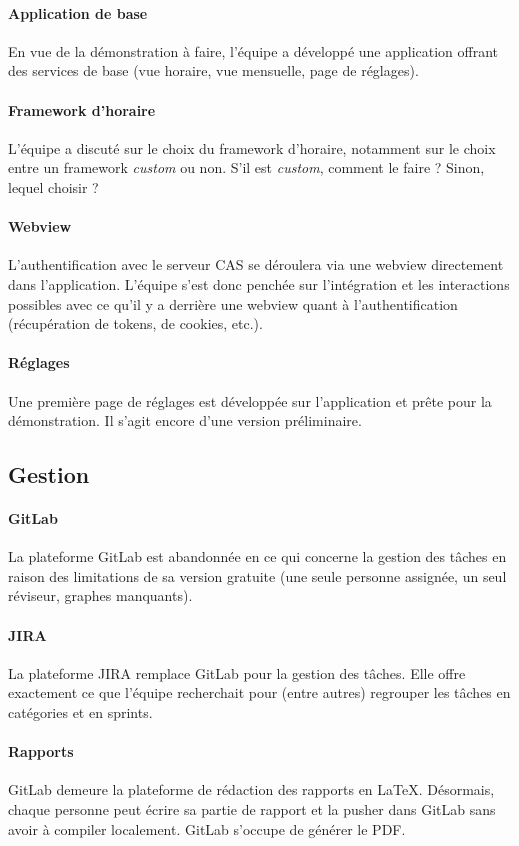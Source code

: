 	\paragraph{Application de base} En vue de la démonstration à faire, l'équipe a développé une application offrant des services de base (vue horaire, vue mensuelle, page de réglages).
	
	\paragraph{Framework d'horaire} L'équipe a discuté sur le choix du framework d'horaire, notamment sur le choix entre un framework \emph{custom} ou non. S'il est \emph{custom}, comment le faire ? Sinon, lequel choisir ?
	
	\paragraph{Webview} L'authentification avec le serveur CAS se déroulera via une webview directement dans l'application. L'équipe s'est donc penchée sur l'intégration et les interactions possibles avec ce qu'il y a derrière une webview quant à l'authentification (récupération de tokens, de cookies, etc.).	
	
	\paragraph{Réglages} Une première page de réglages est développée sur l'application et prête pour la démonstration. Il s'agit encore d'une version préliminaire.
	
	\subsection{Gestion}

	\paragraph{GitLab} La plateforme GitLab est abandonnée en ce qui concerne la gestion des tâches en raison des limitations de sa version gratuite (une seule personne assignée, un seul réviseur, graphes manquants).
	
	\paragraph{JIRA} La plateforme JIRA remplace GitLab pour la gestion des tâches. Elle offre exactement ce que l'équipe recherchait pour (entre autres) regrouper les tâches en catégories et en sprints.
	
	\paragraph{Rapports} GitLab demeure la plateforme de rédaction des rapports en \LaTeX. Désormais, chaque personne peut écrire sa partie de rapport et la pusher dans GitLab sans avoir à compiler localement. GitLab s'occupe de générer le PDF.
	
	

